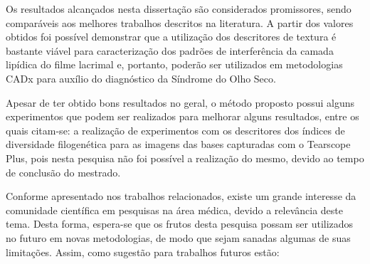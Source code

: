 Os resultados alcançados nesta dissertação são considerados promissores, sendo comparáveis aos melhores trabalhos descritos na literatura. A partir dos valores obtidos foi possível demonstrar que a utilização dos descritores de textura é bastante viável para caracterização dos padrões de interferência da camada lipídica do filme lacrimal e, portanto, poderão ser utilizados em metodologias CADx para auxílio do diagnóstico da Síndrome do Olho Seco.

Apesar de ter obtido bons resultados no geral, o método proposto possui alguns experimentos que podem ser realizados para melhorar alguns resultados, entre os quais citam-se: a realização de experimentos com os descritores dos índices de diversidade filogenética para as imagens das bases capturadas com o Tearscope Plus, pois nesta pesquisa não foi possível a realização do mesmo, devido ao tempo de conclusão do mestrado.

Conforme apresentado nos trabalhos relacionados, existe um grande interesse da comunidade científica em pesquisas na área médica, devido a relevância deste tema. Desta forma, espera-se que os frutos desta pesquisa possam ser utilizados no futuro em novas metodologias, de modo que sejam sanadas algumas de suas limitações. Assim, como sugestão para trabalhos futuros estão:

